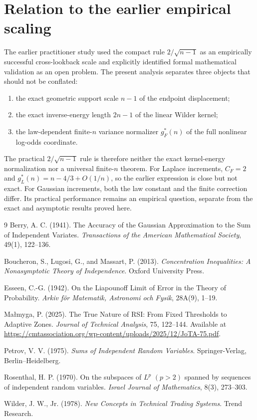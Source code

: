 \documentclass[11pt]{article}
\begin{document}
\section{Relation to the earlier empirical scaling}
The earlier practitioner study \cite{malmyga2025} used the compact rule
$2/\sqrt{n-1}$ as an empirically successful cross-lookback scale and
explicitly identified formal mathematical validation as an open problem.  The
present analysis separates three objects that should not be conflated:
\begin{enumerate}
\item the exact geometric support scale $n-1$ of the endpoint displacement;
\item the exact inverse-energy length $2n-1$ of the linear Wilder kernel;
\item the law-dependent finite-$n$ variance normalizer $g_F^*(n)$ of the full
nonlinear log-odds coordinate.
\end{enumerate}
The practical $2/\sqrt{n-1}$ rule is therefore neither the exact kernel-energy
normalization nor a universal finite-$n$ theorem.  For Laplace increments,
$C_F=2$ and $g_L^*(n)=n-4/3+O(1/n)$, so the earlier expression is close but not
exact.  For Gaussian increments, both the law constant and the finite
correction differ.  Its practical performance remains an empirical question,
separate from the exact and asymptotic results proved here.

\begin{thebibliography}{9}
Berry, A. C. (1941). The Accuracy of the Gaussian Approximation to the Sum of Independent Variates. \emph{Transactions of the American Mathematical Society}, 49(1), 122--136.


Boucheron, S., Lugosi, G., and Massart, P. (2013). \emph{Concentration Inequalities: A Nonasymptotic Theory of Independence}. Oxford University Press.

Esseen, C.-G. (1942). On the Liapounoff Limit of Error in the Theory of Probability. \emph{Arkiv f\"or Matematik, Astronomi och Fysik}, 28A(9), 1--19.

Ma{\l}myga, P. (2025). The True Nature of RSI: From Fixed Thresholds to Adaptive Zones. \emph{Journal of Technical Analysis}, 75, 122--144. Available at \url{https://cmtassociation.org/wp-content/uploads/2025/12/JoTA-75.pdf}.


Petrov, V. V. (1975). \emph{Sums of Independent Random Variables}. Springer-Verlag, Berlin--Heidelberg.

Rosenthal, H. P. (1970). On the subspaces of $L^p$ $(p>2)$ spanned by sequences of independent random variables. \emph{Israel Journal of Mathematics}, 8(3), 273--303.

Wilder, J. W., Jr. (1978). \emph{New Concepts in Technical Trading Systems}. Trend Research.
\end{thebibliography}
\end{document}
